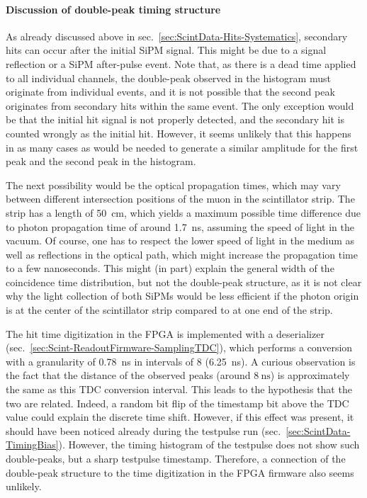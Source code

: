 \paragraph{Discussion of double-peak timing structure}
As already discussed above in sec.\ \ref{sec:ScintData-Hits-Systematics}, secondary hits can occur after the initial \ac{SiPM} signal. This might be due to a signal reflection or a \ac{SiPM} after-pulse event. Note that, as there is a dead time applied to all individual channels, the double-peak observed in the histogram must originate from individual events, and it is not possible that the second peak originates from secondary hits within the same event. The only exception would be that the initial hit signal is not properly detected, and the secondary hit is counted wrongly as the initial hit. However, it seems unlikely that this happens in as many cases as would be needed to generate a similar amplitude for the first peak and the second peak in the histogram.
\par The next possibility would be the optical propagation times, which may vary between different intersection positions of the muon in the scintillator strip. The strip has a length of \SI{50}{\centi\meter}, which yields a maximum possible time difference due to photon propagation time of around \SI{1.7}{\nano\second}, assuming the speed of light in the vacuum. Of course, one has to respect the lower speed of light in the medium as well as reflections in the optical path, which might increase the propagation time to a few nanoseconds. This might (in part) explain the general width of the coincidence time distribution, but not the double-peak structure, as it is not clear why the light collection of both \acp{SiPM} would be less efficient if the photon origin is at the center of the scintillator strip compared to at one end of the strip.
\par The hit time digitization in the \ac{FPGA} is implemented with a deserializer (sec.\ \ref{sec:Scint-ReadoutFirmware-SamplingTDC}), which performs a conversion with a granularity of \SI{0.78}{\nano\second} in intervals of \SI{8}{\tu} (\SI{6.25}{\nano\second}). A curious observation is the fact that the distance of the observed peaks (around $\SI{8}{\nano\second}$) is approximately the same as this \ac{TDC} conversion interval. This leads to the hypothesis that the two are related. Indeed, a random bit flip of the timestamp bit above the \ac{TDC} value could explain the discrete time shift. However, if this effect was present, it should have been noticed already during the testpulse run (sec.\ \ref{sec:ScintData-TimingBias}). However, the timing histogram of the testpulse does not show such double-peaks, but a sharp testpulse timestamp. Therefore, a connection of the double-peak structure to the time digitization in the \ac{FPGA} firmware also seems unlikely.
